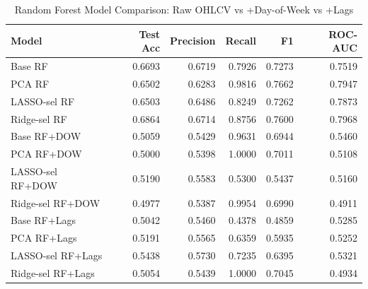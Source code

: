 \begin{table}[htbp]
\centering
\caption{Random Forest Model Comparison: Raw OHLCV vs +Day-of-Week vs +Lags}
\label{tab:base_rf_comparison_1se}
\begin{tabular}{lrrrrr}
\toprule
Model & Test Acc & Precision & Recall & F1 & ROC-AUC \\
\midrule
Base RF & 0.6693 & 0.6719 & 0.7926 & 0.7273 & 0.7519 \\
PCA RF & 0.6502 & 0.6283 & 0.9816 & 0.7662 & 0.7947 \\
LASSO-sel RF & 0.6503 & 0.6486 & 0.8249 & 0.7262 & 0.7873 \\
Ridge-sel RF & 0.6864 & 0.6714 & 0.8756 & 0.7600 & 0.7968 \\
\midrule
Base RF+DOW & 0.5059 & 0.5429 & 0.9631 & 0.6944 & 0.5460 \\
PCA RF+DOW & 0.5000 & 0.5398 & 1.0000 & 0.7011 & 0.5108 \\
LASSO-sel RF+DOW & 0.5190 & 0.5583 & 0.5300 & 0.5437 & 0.5160 \\
Ridge-sel RF+DOW & 0.4977 & 0.5387 & 0.9954 & 0.6990 & 0.4911 \\
\midrule
Base RF+Lags & 0.5042 & 0.5460 & 0.4378 & 0.4859 & 0.5285 \\
PCA RF+Lags & 0.5191 & 0.5565 & 0.6359 & 0.5935 & 0.5252 \\
LASSO-sel RF+Lags & 0.5438 & 0.5730 & 0.7235 & 0.6395 & 0.5321 \\
Ridge-sel RF+Lags & 0.5054 & 0.5439 & 1.0000 & 0.7045 & 0.4934 \\
\bottomrule
\end{tabular}
\end{table}
